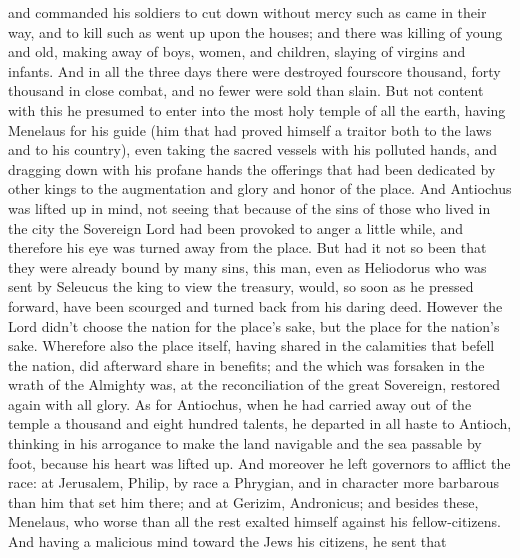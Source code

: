 {and commanded his soldiers to cut down without mercy such as came in their way, and to kill such as went up upon the houses;
and there was killing of young and old, making away of boys, women, and children, slaying of virgins and infants.
And in all the three days
{} there were destroyed fourscore thousand,
{} forty thousand
{} in close combat, and no fewer were sold than slain.
But not content with this he presumed to enter into the most holy temple of all the earth, having Menelaus for his guide (him that had proved himself a traitor both to the laws and to his country),
even taking the sacred vessels with his polluted hands, and dragging down with his profane hands the offerings that had been dedicated by other kings to the augmentation and glory and honor of the place.
And Antiochus was lifted up in mind, not seeing that because of the sins of those who lived in the city the Sovereign Lord had been provoked to anger a little while, and therefore his eye was
{} turned away from the place.
But had it not so been that they were already bound by many sins, this man, even as Heliodorus who was sent by Seleucus the king to view the treasury, would, so soon as he pressed forward, have been scourged and turned back from his daring deed.
However the Lord didn’t choose the nation for the place’s sake, but the place for the nation’s sake.
Wherefore also the place itself, having shared in the calamities that befell the nation, did afterward share in
{} benefits; and the
{} which was forsaken in the wrath of the Almighty was, at the reconciliation of the great Sovereign, restored again with all glory.
As for Antiochus, when he had carried away out of the temple a thousand and eight hundred talents, he departed in all haste to Antioch, thinking in his arrogance to make the land navigable and the sea passable by foot, because his heart was lifted up.
And moreover he left governors to afflict the race: at Jerusalem, Philip, by race a Phrygian, and in character more barbarous than him that set him there;
and at Gerizim, Andronicus; and besides these, Menelaus, who worse than all the rest exalted himself against his fellow-citizens. And having a malicious mind
 toward the Jews
{} his citizens,
he sent that
}
